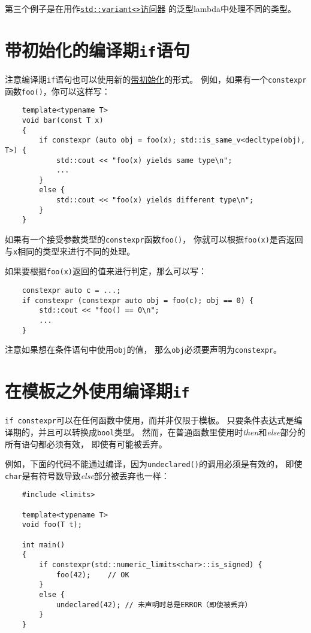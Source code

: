 第三个例子是在用作\hyperref[ch16.3.3.2]{\texttt{std::variant<>}访问器}
的泛型lambda中处理不同的类型。

\section{带初始化的编译期\texttt{if}语句}
注意编译期\texttt{if}语句也可以使用新的\hyperref[ch2]{带初始化}的形式。
例如，如果有一个\texttt{constexpr}函数\texttt{foo()}，你可以这样写：
\begin{lstlisting}
    template<typename T>
    void bar(const T x)
    {
        if constexpr (auto obj = foo(x); std::is_same_v<decltype(obj), T>) {
            std::cout << "foo(x) yields same type\n";
            ...
        }
        else {
            std::cout << "foo(x) yields different type\n";
        }
    }
\end{lstlisting}
如果有一个接受参数类型的\texttt{constexpr}函数\texttt{foo()}，
你就可以根据\texttt{foo(x)}是否返回与\texttt{x}相同的类型来进行不同的处理。

如果要根据\texttt{foo(x)}返回的值来进行判定，那么可以写：
\begin{lstlisting}
    constexpr auto c = ...;
    if constexpr (constexpr auto obj = foo(c); obj == 0) {
        std::cout << "foo() == 0\n";
        ...
    }
\end{lstlisting}
注意如果想在条件语句中使用\texttt{obj}的值，
那么\texttt{obj}必须要声明为\texttt{constexpr}。

\section{在模板之外使用编译期\texttt{if}}
\texttt{if constexpr}可以在任何函数中使用，而并非仅限于模板。
只要条件表达式是编译期的，并且可以转换成\texttt{bool}类型。
然而，在普通函数里使用时\emph{then}和\emph{else}部分的所有语句都必须有效，
即使有可能被丢弃。

例如，下面的代码不能通过编译，因为\texttt{undeclared()}的调用必须是有效的，
即使\texttt{char}是有符号数导致\emph{else}部分被丢弃也一样：
\begin{lstlisting}
    #include <limits>

    template<typename T>
    void foo(T t);

    int main()
    {
        if constexpr(std::numeric_limits<char>::is_signed) {
            foo(42);    // OK
        }
        else {
            undeclared(42); // 未声明时总是ERROR（即使被丢弃）
        }
    }
\end{lstlisting}

